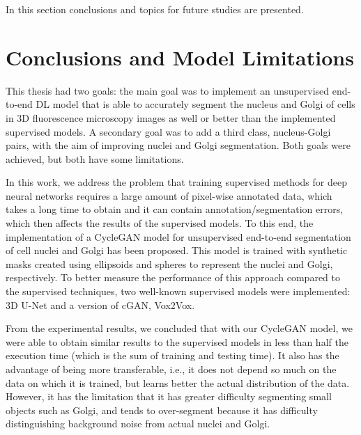 \label{chap:conclusion}

In this section conclusions and topics for future studies are presented.
\section{Conclusions and Model Limitations}

This thesis had two goals: the main goal was to implement an unsupervised end-to-end \ac{DL} model that is able to accurately segment the nucleus and Golgi of cells in \ac{3D} fluorescence microscopy images as well or better than the implemented supervised models. A secondary goal was to add a third class, nucleus-Golgi pairs, with the aim of improving nuclei and Golgi segmentation. Both goals were achieved, but both have some limitations.

In this work, we address the problem that training supervised methods for deep neural networks requires a large amount of pixel-wise annotated data, which takes a long time to obtain and it can contain annotation/segmentation errors, which then affects the results of the supervised models. To this end, the implementation of a CycleGAN model for unsupervised end-to-end segmentation of cell nuclei and Golgi has been proposed. This model is trained with synthetic masks created using ellipsoids and spheres to represent the nuclei and Golgi, respectively. To better measure the performance of this approach compared to the supervised techniques, two well-known supervised models were implemented: \ac{3D} U-Net and a version of \ac{cGAN}, Vox2Vox. 

From the experimental results, we concluded that with our CycleGAN model, we were able to obtain similar results to the supervised models in less than half the execution time (which is the sum of training and testing time). It also has the advantage of being more transferable, i.e., it does not depend so much on the data on which it is trained, but learns better the actual distribution of the data. However, it has the limitation that it has greater difficulty segmenting small objects such as Golgi, and tends to over-segment because it has difficulty distinguishing background noise from actual nuclei and Golgi.

